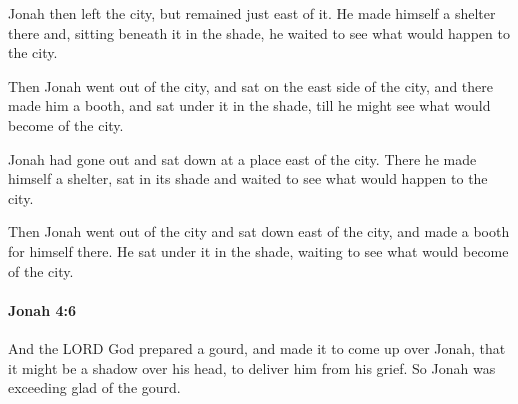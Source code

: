 			\begin{versebox}
					\item[BHS] 
					\item[LXX] 
					\item[AB 1990 270] Jonah then left the city, but remained just east of it. He made himself a shelter there and, sitting beneath it in the shade, he waited to see what would happen to the city.
					\item[ASV] Then Jonah went out of the city, and sat on the east side of the city, and there made him a booth, and sat under it in the shade, till he might see what would become of the city.
					\item[NIV] Jonah had gone out and sat down at a place east of the city. There he made himself a shelter, sat in its shade and waited to see what would happen to the city.
					\item[NRSV] Then Jonah went out of the city and sat down east of the city, and made a booth for himself there. He sat under it in the shade, waiting to see what would become of the city.
			\end{versebox}

		\paragraph{Jonah 4:6} %
			\label{JONAH-4-6}

			And the LORD God prepared a gourd, and made it to come up over Jonah, that it might be a shadow over his head, to deliver him from his grief. So Jonah was exceeding glad of the gourd.

